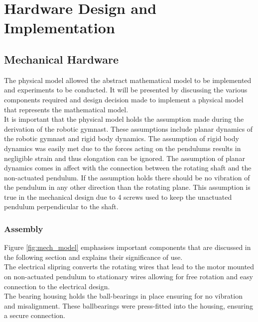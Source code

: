 \chapter{Hardware Design and Implementation}


\section{Mechanical Hardware}
The physical model allowed the abstract mathematical model to be implemented and experiments to be conducted. It will be presented by discussing the various components required and design decision made to implement a physical model that represents the mathematical model.\\

It is important that the physical model holds the assumption made during the derivation of the robotic gymnast. These assumptions include planar dynamics of the robotic gymnast and rigid body dynamics. The assumption of rigid body dynamics was easily met due to the forces acting on the pendulums results in negligible strain and thus elongation can be ignored. The assumption of planar dynamics comes in affect with the connection between the rotating shaft and the non-actuated pendulum. If the assumption holds there should be no vibration of the pendulum in any other direction than the rotating plane. This assumption is true in the mechanical design due to 4 screws used to keep the unactuated pendulum perpendicular to the shaft. \\

\subsection{Assembly}
Figure \ref{fig:mech_model} emphasises important components that are discussed in the following section and explains their significance of use.\\

The electrical slipring converts the rotating wires that lead to the motor mounted on non-actuated pendulum to stationary wires allowing for free rotation and easy connection to the electrical design.\\

The bearing housing holds the ball-bearings in place ensuring for no vibration and misalignment. These ballbearings were press-fitted into the housing, ensuring a secure connection.\\

